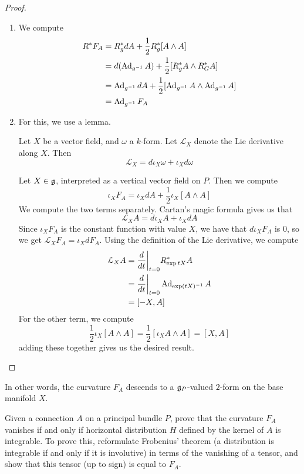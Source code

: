 \begin{proof} \enumbreak
\begin{enumerate}
  \item We compute
  \begin{align*}
  R^*F_A &= R^*_gdA + \frac{1}{2}R^*_g[A \wedge A] \\
  &= d(\operatorname{Ad}_{g^{-1}}A) + \frac{1}{2}[R^*_gA \wedge R^*_GA] \\
  &= \operatorname{Ad}_{g^{-1}}dA + \frac{1}{2}[\operatorname{Ad}_{g^{-1}}A \wedge \operatorname{Ad}_{g^{-1}}A] \\
  &= \operatorname{Ad}_{g^{-1}}F_A
  \end{align*}
  \item For this, we use a lemma.
  \begin{lem*}
  Let $X$ be a vector field, and $\omega$ a $k$-form. Let $\mathcal{L}_X$ denote
  the Lie derivative along $X$. Then
  \[
  \mathcal{L}_X = d\iota_X\omega + \iota_Xd\omega
  \]
  \end{lem*}
  Let $X \in \mathfrak{g}$, interpreted as a vertical vector field on $P$. Then
  we compute
  \[
  \iota_XF_A = \iota_XdA + \frac{1}{2}\iota_X[A \wedge A]
  \]
  We compute the two terms separately. Cartan's magic formula gives us that
  \[
  \mathcal{L}_XA = d\iota_XA + \iota_XdA
  \]
  Since $\iota_XF_A$ is the constant function with value $X$,
  we have that $d\iota_XF_A$ is $0$, so we get $\mathcal{L}_XF_A = \iota_XdF_A$.
  Using the definition of the Lie derivative, we compute
  \begin{align*}
  \mathcal{L}_XA &= \frac{d}{dt}\bigg\vert_{t=0}R^*_{\exp{tX}}A \\
  &= \frac{d}{dt}\bigg\vert_{t=0}\operatorname{Ad}_{\exp(tX)^{-1}}A  \\
  &= [-X, A]
  \end{align*}
  For the other term, we compute
  \[
  \frac{1}{2}\iota_X[A \wedge A] = \frac{1}{2}[\iota_XA \wedge A] = [X,A]
  \]
  adding these together gives us the desired result.
\end{enumerate}
\end{proof}
%
In other words, the curvature $F_A$ descends to a $\mathfrak{g}_P$-valued $2$-form
on the base manifold $X$.
%
\begin{exer}
Given a connection $A$ on a principal bundle $P$, prove that the curvature
$F_A$ vanishes if and only if horizontal distribution $H$ defined by the
kernel of $A$ is integrable. To prove this, reformulate Frobenius' theorem
(a distribution is integrable if and only if it is involutive) in terms
of the vanishing of a tensor, and show that this tensor (up to sign) is equal
to $F_A$.
\end{exer}
